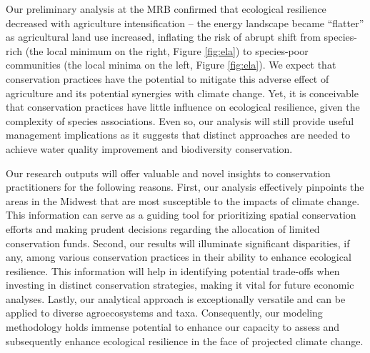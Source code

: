 \documentclass[12pt, class=article, crop=false]{standalone}
\begin{document}
Our preliminary analysis at the MRB confirmed that ecological resilience decreased with agriculture intensification -- the energy landscape became ``flatter'' as agricultural land use increased, inflating the risk of abrupt shift from species-rich (the local minimum on the right, Figure \ref{fig:ela}) to species-poor communities (the local minima on the left, Figure \ref{fig:ela}).
We expect that conservation practices have the potential to mitigate this adverse effect of agriculture and its potential synergies with climate change.
Yet, it is conceivable that conservation practices have little influence on ecological resilience, given the complexity of species associations.
Even so, our analysis will still provide useful management implications as it suggests that distinct approaches are needed to achieve water quality improvement and biodiversity conservation.

Our research outputs will offer valuable and novel insights to conservation practitioners for the following reasons.
First, our analysis effectively pinpoints the areas in the Midwest that are most susceptible to the impacts of climate change. This information can serve as a guiding tool for prioritizing spatial conservation efforts and making prudent decisions regarding the allocation of limited conservation funds.
Second, our results will illuminate significant disparities, if any, among various conservation practices in their ability to enhance ecological resilience. This information will help in identifying potential trade-offs when investing in distinct conservation strategies, making it vital for future economic analyses.
Lastly, our analytical approach is exceptionally versatile and can be applied to diverse agroecosystems and taxa.
Consequently, our modeling methodology holds immense potential to enhance our capacity to assess and subsequently enhance ecological resilience in the face of projected climate change.
\end{document}
